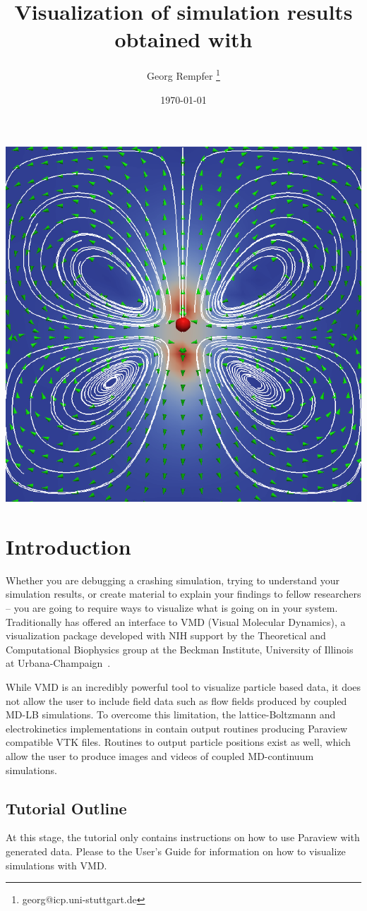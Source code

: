 \renewcommand{\d}{\mathrm d}
\subject{ESPResSo Tutorial}
\title{Visualization of simulation results obtained with \ES{}
} \author{ Georg Rempfer \thanks{\ttfamily 
georg@icp.uni-stuttgart.de}}
\date{\today}
\publishers{Institute for Computational Physics, University of Stuttgart}
\maketitle 
\begin{center}
  \includegraphics[width=0.5\columnwidth]{figures/flow_field.pdf}
\end{center}
\pagebreak
{}

 \tableofcontents
 \pagebreak
  
\section{Introduction}


Whether you are debugging a crashing simulation, trying to understand your simulation results, or create material to explain your findings to fellow researchers -- you are going to require ways to visualize what is going on in your system. Traditionally \ES{} has offered an interface to VMD (Visual Molecular Dynamics), a visualization package developed with NIH support by the Theoretical and Computational Biophysics group at the Beckman Institute, University of Illinois at Urbana-Champaign~\cite{vmd}.

While VMD is an incredibly powerful tool to visualize particle based data, it does not allow the user to include field data such as flow fields produced by coupled MD-LB simulations. To overcome this limitation, the lattice-Boltzmann and electrokinetics implementations in \ES{} contain output routines producing Paraview compatible VTK files. Routines to output particle positions exist as well, which allow the user to produce images and videos of coupled MD-continuum simulations.

\subsection*{Tutorial Outline}

At this stage, the tutorial only contains instructions on how to use Paraview with \ES{} generated data. Please to the User's Guide for information on how to visualize \ES{} simulations with VMD.

\pagebreak
